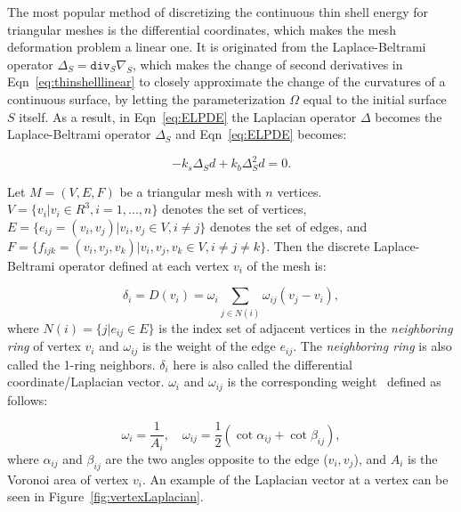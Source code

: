 The most popular method of discretizing the continuous thin shell energy for triangular meshes is the differential coordinates, which makes the mesh deformation problem a linear one. It is originated from the Laplace-Beltrami operator $\Delta_S=\texttt{div}_S\nabla_S$, which makes the change of second derivatives in Eqn~\ref{eq:thinshelllinear} to closely approximate the change of the curvatures of a continuous surface, by letting the parameterization $\Omega$ equal to the initial surface $S$ itself. As a result, in Eqn~\ref{eq:ELPDE} the Laplacian operator $\Delta$ becomes the Laplace-Beltrami operator $\Delta_S$ and Eqn~\ref{eq:ELPDE} becomes:

\begin{equation}
\label{eq:LBcontin}
	-k_s\Delta_S d+k_b\Delta_S^2 d=0.
\end{equation}

Let $M=(V,E,F)$ be a triangular mesh with $n$ vertices. $V = \{v_i | v_i \in R^3, i = 1,...,n\}$ denotes
the set of vertices, $E = \{e_{ij} = (v_i, v_j) | v_i,v_j \in V, i\ne j\}$ denotes the set of edges, and $F = \{f_{ijk} = (v_i, v_j, v_k) | v_i,v_j,v_k \in V, i\ne j\ne k\}$. Then the discrete Laplace-Beltrami operator defined at each vertex $v_i$ of the mesh is:

\begin{equation}
\label{eq:LBdisc}
\delta_i=D(v_i)=\omega_i \sum\limits_{j\in N(i)}{\omega_{ij} (v_j-v_i)},
\end{equation}
where $N(i)=\{j|e_{ij}\in E\}$ is the index set of adjacent vertices in the \textit{neighboring ring} of vertex $v_i$ and $\omega_{ij}$ is the weight of the edge $e_{ij}$. The \textit{neighboring ring} is also called the 1-ring neighbors. $\delta_i$ here is also called the differential coordinate/Laplacian vector. $\omega_i$ and $\omega_{ij}$ is the corresponding weight~\cite{MDSB02} defined as follows:

\begin{equation}
\label{eq:laplacebetramiweight}
\omega_i=\frac{1}{A_i},\quad \omega_{ij}=\frac{1}{2}(\cot \alpha_{ij}+ \cot \beta_{ij}),
\end{equation}
where $\alpha_{ij}$ and $\beta_{ij}$ are the two angles opposite to the edge ($v_i,v_j$), and $A_i$ is the Voronoi area of vertex $v_i$. An example of the Laplacian vector at a vertex can be seen in Figure~\ref{fig:vertexLaplacian}.

